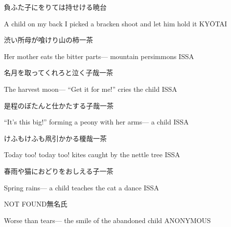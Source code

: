 \begin{haiku}
    {\FH 負ふた子にをりては持せける}\hfill{\FH 暁台}

    \vin{} A child on my back
    \vin{} \vin{} I picked a bracken shoot
    \vin{} \vin{} \vin{} and let him hold it \hspace{\fill} KY\={O}TAI
\end{haiku}

\begin{haiku}
    {\FH 渋い所母が喰けり山の柿}\hfill{\FH 一茶}

    \vin{} Her mother eats
    \vin{} \vin{} the bitter parts---
    \vin{} \vin{} \vin{} mountain persimmons \hspace{\fill} ISSA
\end{haiku}

\begin{haiku}
    {\FH 名月を取ってくれろと泣く子哉}\hfill{\FH 一茶}

    \vin{} The harvest moon---
    \vin{} \vin{} ``Get it for me!''
    \vin{} \vin{} \vin{} cries the child \hspace{\fill} ISSA
\end{haiku}

\begin{haiku}
    {\FH 是程のぼたんと仕かたする子哉}\hfill{\FH 一茶}

    \vin{} ``It's this big!''
    \vin{} \vin{} forming a peony with her arms---
    \vin{} \vin{} \vin{} a child \hspace{\fill} ISSA
\end{haiku}

\begin{haiku}
    {\FH けふもけふも凧引かかる榎哉}\hfill{\FH 一茶}

    \vin{} Today too!
    \vin{} \vin{} today too! kites caught
    \vin{} \vin{} \vin{} by the nettle tree \hspace{\fill} ISSA
\end{haiku}

\begin{haiku}
    {\FH 春雨や猫におどりをおしえる子}\hfill{\FH 一茶}

    \vin{} Spring rains---
    \vin{} \vin{} a child teaches the cat
    \vin{} \vin{} \vin{} a dance \hspace{\fill} ISSA
\end{haiku}

\begin{haiku}
    NOT FOUND\hfill{\FH 無名氏}

    \vin{} Worse than tears---
    \vin{} \vin{} the smile of the
    \vin{} \vin{} \vin{} abandoned child \hspace{\fill} ANONYMOUS
\end{haiku}

